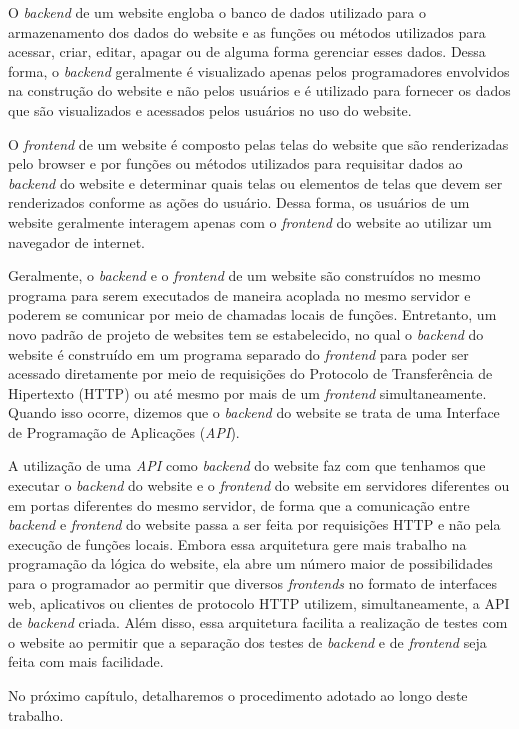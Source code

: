 O \textit{backend} de um website engloba o banco de dados utilizado para o armazenamento dos dados do website e as funções ou métodos utilizados para acessar, criar, editar, apagar ou de alguma forma gerenciar esses dados. Dessa forma, o \textit{backend} geralmente é visualizado apenas pelos programadores envolvidos na construção do website e não pelos usuários e é utilizado para fornecer os dados que são visualizados e acessados pelos usuários no uso do website.

O \textit{frontend} de um website é composto pelas telas do website que são renderizadas pelo browser e por funções ou métodos utilizados para requisitar dados ao \textit{backend} do website e determinar quais telas ou elementos de telas que devem ser renderizados conforme as ações do usuário. Dessa forma, os usuários de um website geralmente interagem apenas com o \textit{frontend} do website ao utilizar um navegador de internet.

Geralmente, o \textit{backend} e o \textit{frontend} de um website são construídos no mesmo programa para serem executados de maneira acoplada no mesmo servidor e poderem se comunicar por meio de chamadas locais de funções. Entretanto, um novo padrão de projeto de websites tem se estabelecido, no qual o \textit{backend} do website é construído em um programa separado do \textit{frontend} para poder ser acessado diretamente por meio de requisições do Protocolo de Transferência de Hipertexto (HTTP) ou até mesmo por mais de um \textit{frontend} simultaneamente. Quando isso ocorre, dizemos que o \textit{backend} do website se trata de uma Interface de Programação de Aplicações (\textit{API}).

A utilização de uma \textit{API} como \textit{backend} do website faz com que tenhamos que executar o \textit{backend} do website e o \textit{frontend} do website em servidores diferentes ou em portas diferentes do mesmo servidor, de forma que a comunicação entre \textit{backend} e \textit{frontend} do website passa a ser feita por requisições HTTP e não pela execução de funções locais. Embora essa arquitetura gere mais trabalho na programação da lógica do website, ela abre um número maior de possibilidades para o programador ao permitir que diversos \textit{frontends} no formato de interfaces web, aplicativos ou clientes de protocolo HTTP utilizem, simultaneamente, a API de \textit{backend} criada. Além disso, essa arquitetura facilita a realização de testes com o website ao permitir que a separação dos testes de \textit{backend} e de \textit{frontend} seja feita com mais facilidade.

No próximo capítulo, detalharemos o procedimento adotado ao longo deste trabalho.
